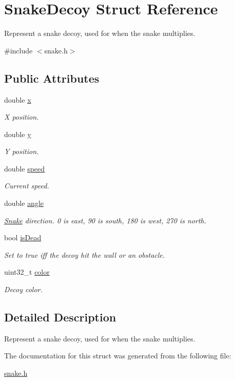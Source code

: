 \hypertarget{struct_snake_decoy}{}\section{Snake\+Decoy Struct Reference}
\label{struct_snake_decoy}


Represent a snake decoy, used for when the snake multiplies.  




{\ttfamily \#include $<$snake.\+h$>$}

\subsection*{Public Attributes}
\begin{DoxyCompactItemize}
\item 
double \mbox{\hyperlink{group__snake_ga6245e649ad55ae856c956d31a1a4d2e5}{x}}
\begin{DoxyCompactList}\small\item\em X position. \end{DoxyCompactList}\item 
double \mbox{\hyperlink{group__snake_gad6c137495e858da565b3d7af5c8a480e}{y}}
\begin{DoxyCompactList}\small\item\em Y position. \end{DoxyCompactList}\item 
double \mbox{\hyperlink{group__snake_gac676e96d99b1a684120e6cf048e2e6c0}{speed}}
\begin{DoxyCompactList}\small\item\em Current speed. \end{DoxyCompactList}\item 
double \mbox{\hyperlink{group__snake_ga24389f11de2d62dfff3e4357053e0083}{angle}}
\begin{DoxyCompactList}\small\item\em \mbox{\hyperlink{struct_snake}{Snake}} direction. 0 is east, 90 is south, 180 is west, 270 is north. \end{DoxyCompactList}\item 
bool \mbox{\hyperlink{group__snake_ga825c2d7442b47b340bbf95bd42bc5435}{is\+Dead}}
\begin{DoxyCompactList}\small\item\em Set to true iff the decoy hit the wall or an obstacle. \end{DoxyCompactList}\item 
uint32\+\_\+t \mbox{\hyperlink{group__snake_ga5234b4454a0f59fc2aac841aeb03fbe9}{color}}
\begin{DoxyCompactList}\small\item\em Decoy color. \end{DoxyCompactList}\end{DoxyCompactItemize}


\subsection{Detailed Description}
Represent a snake decoy, used for when the snake multiplies. 

The documentation for this struct was generated from the following file\+:\begin{DoxyCompactItemize}
\item 
\mbox{\hyperlink{snake_8h}{snake.\+h}}\end{DoxyCompactItemize}
